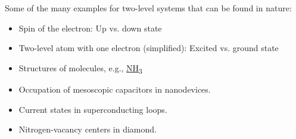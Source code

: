 Some of the many examples for two-level systems that can be found in nature:
\begin{itemize}
	\item Spin of the electron: Up vs. down state
	\item Two-level atom with one electron (simplified): Excited vs. ground state
	\item Structures of molecules, e.g., \hyperref[fig:twostate]{NH\textsubscript{3}}
	\item Occupation of mesoscopic capacitors in nanodevices.
	\item Current states in superconducting loops.
	\item Nitrogen-vacancy centers in diamond.
\end{itemize}